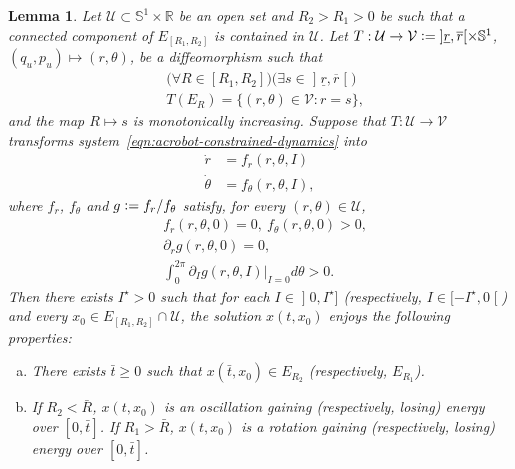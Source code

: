 \documentclass[journal,twoside,web, twocolumn,draftcls]{ieeecolor}
\newtheorem{lemma}{Lemma} %
\renewcommand*{\Re}{\mathbb{R}}
\newcommand*{\Sone}{\mathbb{S}^1}
\newcommand*{\cU}{\mathcal{U}}
\newcommand*{\cV}{\mathcal{V}}
\newcommand*{\eqdef}{\vcentcolon=}
\begin{document}
\begin{lemma}\label{lem:gain_lose}Let $\cU \subset \Sone \times \Re$ be an open set and $R_2 > R_1 >0$ be such that a connected component of $E_{[R_1,R_2]}$ is contained in $\cU$. Let $T : \cU \to \cV \eqdef \mathopen]\underline{r},\overline{r}[ \times \Sone$, $(q_u,p_u) \mapsto (r,\theta)$, be a diffeomorphism such that 
\begin{equation}\label{eq:T_property}
\begin{aligned}
&\big(\forall R \in [R_1,R_2]\big) \big(\exists s \in \mathopen]\underline{r},\overline{r}\mathclose[\big) \\
& T(E_R) = \{(r,\theta) \in \cV: r = s \},
\end{aligned}
\end{equation}
and the map $R \mapsto s$ is monotonically increasing.
Suppose that $T: \cU \to \cV$ transforms system~\eqref{eqn:acrobot-constrained-dynamics} into
\begin{equation}
\label{eq:r_theta_system}
\begin{aligned}
\dot r &= f_r(r,\theta,I) \\
\dot \theta &= f_\theta(r,\theta,I),
\end{aligned}
\end{equation}
where $f_r$, $f_\theta$ and $g \eqdef f_r / f_\theta$ satisfy, for every $(r,\theta) \in \cU$,
\begin{subequations}\label{eq:lemma_assumptions}
\begin{align}
& f_r(r,\theta,0) = 0, \ f_\theta(r,\theta,0) >0, \label{eq:lemma_assumptions:1}\\
& \partial_r g(r,\theta,0) =0, \label{eq:lemma:assumptions:2}\\
& \int_0^{2\pi} \partial_I g(r,\theta,I)\big|_{I=0} d \theta >0. \label{eq:lemma:assumptions:3} 
\end{align}
\end{subequations}
Then there exists $I^\star>0$ such that for each $I \in \mathopen]0,I^\star]$ (respectively, $I \in [-I^\star,0\mathclose[$) and every $x_0 \in E_{[R_1,R_2]} \cap \cU$, the solution $x(t,x_0)$ enjoys the following properties:

\begin{enumerate}[(a)]
\item There exists $\bar t \geq 0$ such that $x(\bar t,x_0) \in E_{R_2}$ (respectively, $E_{R_1}$).

\item If $R_2 < \bar R$, $x(t,x_0)$ is an oscillation gaining (respectively, losing) energy over $[0,\bar t]$. If $R_1 > \bar R$, $x(t,x_0)$ is a rotation gaining (respectively, losing) energy over $[0,\bar t]$.
\end{enumerate}
\end{lemma}
\end{document}
